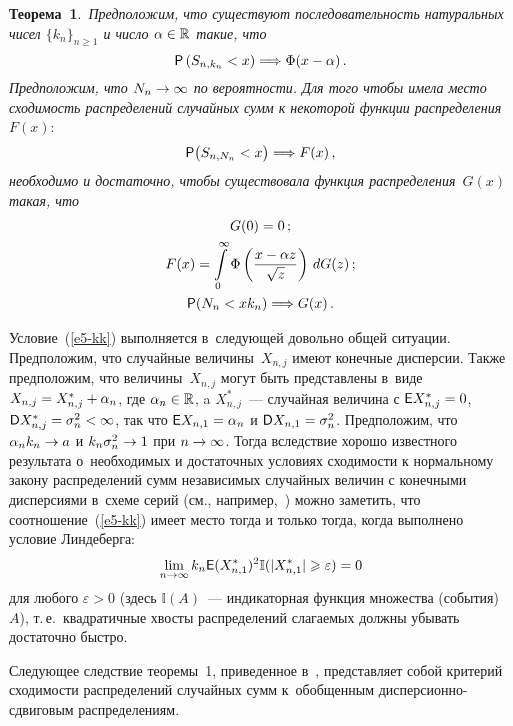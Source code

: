 \begin{multicols}{2}
\noindent
\textbf{Теорема~1}.\ \textit{Предположим, что существуют последовательность
натуральных чисел $\{k_n\}_{n\geqslant1}$ и число $\alpha\hm\in\mathbb{R}$
такие, что}
\begin{equation}
{\sf P}\left(S_{n,k_n}<x\right)\Longrightarrow \Phi(x-\alpha)\,.\label{e5-kk}
\end{equation}
\textit{Предположим, что $N_n\hm\to\infty$ по вероятности. Для того чтобы имела
место сходимость распределений случайных сумм к некоторой функции
распределения}~$F(x)$:
\begin{equation*}
{\sf P}\big(S_{n,N_n}<x\big)\Longrightarrow F(x)\,, %
\end{equation*}
\textit{необходимо и достаточно, чтобы существовала функция распределения~$G(x)$ 
такая, что} 
\begin{gather*}
G(0)=0\,;\\
F(x)=\int\limits_{0}^{\infty}\Phi\left(\fr{x-\alpha
z}{\sqrt{z}}\right)\,dG(z)\,; %
\\
{\sf P}(N_n<xk_n)\Longrightarrow G(x)\,.
\end{gather*}


\smallskip

Условие~(\ref{e5-kk}) выполняется в~следующей довольно общей ситуации.
Предположим, что случайные величины~$X_{n,j}$ имеют конечные
дисперсии. Также предположим, что величины~$X_{n,j}$ могут быть
представлены в~виде $X_{n,j}\hm=X_{n,j}^*\hm+\alpha_n$, где
$\alpha_n\hm\in\mathbb{R}$, a $X_{n,j}^*$~--- случайная величина с ${\sf
E} X_{n,j}^*\hm=0$, ${\sf D} X_{n,j}^*\hm=\sigma_n^2<\infty$, так что
${\sf E} X_{n,1}\hm=\alpha_n$ и ${\sf D} X_{n,1}\hm=\sigma_n^2$.
Предположим, что $\alpha_nk_n\hm\to a$ и $k_n\sigma_n^2\hm\to 1$ при
$n\hm\to\infty$. Тогда вследствие хорошо известного результата 
о~необходимых и достаточных условиях сходимости к нормальному закону
распределений сумм независимых случайных величин с конечными
дисперсиями в~схеме серий (см., например,~\cite{GnedenkoKolmogorov1949}) 
можно заметить, что соотношение~(\ref{e5-kk})
имеет место тогда и только тогда, когда выполнено условие
Линдеберга:
$$
\lim\limits_{n\to\infty}k_n{\sf
E}(X_{n,1}^*)^2\mathbb{I}(|X_{n,1}^*|\geqslant\varepsilon)=0
$$
для любого $\varepsilon>0$ (здесь $\mathbb{I}(A)$~--- индикаторная
функция множества (события)~$A$), т.\,е.\ квадратичные хвосты
распределений слагаемых должны убывать достаточно быстро.

Следующее следствие теоремы~1, приведенное в~\cite{KorolevZaks2013},
представляет собой критерий схо\-ди\-мости распределений случайных сумм
к~обобщенным дис\-пер\-си\-он\-но-сдви\-го\-вым распределениям.


\end{multicols}

